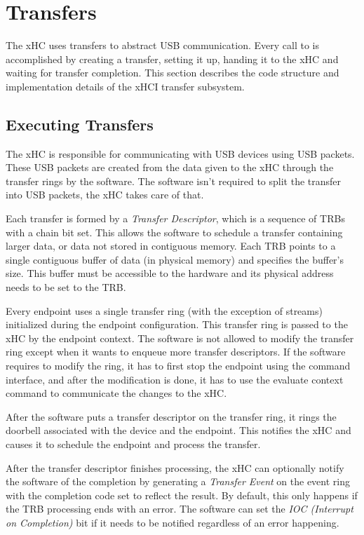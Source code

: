 \section{Transfers}
\label{sec:transfers}

The xHC uses transfers to abstract USB communication. Every call to
 is accomplished by creating a transfer,
setting it up, handing it to the xHC and waiting for transfer completion. This
section describes the code structure and implementation details of the xHCI transfer
subsystem.

\subsection{Executing Transfers}

The xHC is responsible for communicating with USB devices using USB packets.
These USB packets are created from the data given to the xHC through the
transfer rings by the software. The software isn't required to split the
transfer into USB packets, the xHC takes care of that.

Each transfer is formed by a \textit{Transfer Descriptor}, which is a sequence
of TRBs with a chain bit set. This allows the software to schedule a transfer
containing larger data, or data not stored in contiguous memory. Each TRB
points to a single contiguous buffer of data (in physical memory) and specifies
the buffer's size. This buffer must be accessible to the hardware and its
physical address needs to be set to the TRB.

Every endpoint uses a single transfer ring (with the exception of streams)
initialized during the endpoint configuration. This transfer ring is passed to
the xHC by the endpoint context. The software is not allowed to modify the
transfer ring except when it wants to enqueue more transfer descriptors. If the
software requires to modify the ring, it has to first stop the endpoint using
the command interface, and after the modification is done, it has to use the
evaluate context command to communicate the changes to the xHC.

After the software puts a transfer descriptor on the transfer ring, it rings
the doorbell associated with the device and the endpoint. This notifies the xHC
and causes it to schedule the endpoint and process the transfer.

After the transfer descriptor finishes processing, the xHC can optionally
notify the software of the completion by generating a \textit{Transfer Event}
on the event ring with the completion code set to reflect the result. By
default, this only happens if the TRB processing ends with an error.
The software can set the \textit{IOC (Interrupt on Completion)} bit if it needs
to be notified regardless of an error happening.

